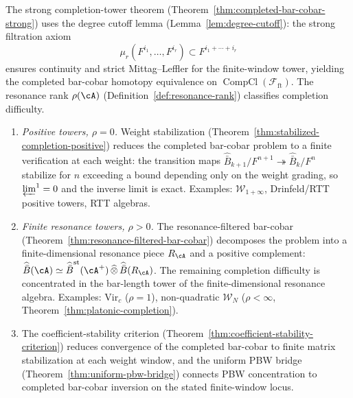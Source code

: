 \begin{construction}
\label{constr:completion-mc4}
The strong completion-tower theorem
(Theorem~\ref{thm:completed-bar-cobar-strong}) uses the degree cutoff
lemma
(Lemma~\ref{lem:degree-cutoff}): the strong filtration axiom
\[
\mu_r(F^{i_1}, \ldots, F^{i_r})
\subset F^{i_1 + \cdots + i_r}
\]
ensures continuity and strict Mittag--Leffler for the finite-window
tower, yielding the completed bar-cobar homotopy equivalence on
$\operatorname{CompCl}(\mathcal{F}_{\mathrm{ft}})$. The
resonance rank $\rho(\cA)$
(Definition~\ref{def:resonance-rank}) classifies completion
difficulty.
\begin{enumerate}[label=\textup{(\roman*)}]
\item \emph{Positive towers, $\rho = 0$.}
 Weight stabilization
 (Theorem~\ref{thm:stabilized-completion-positive})
 reduces the completed bar-cobar problem to a finite
 verification at each weight: the transition maps
 $\widehat{\bar B}_{k+1}/F^{n+1}
 \twoheadrightarrow
 \widehat{\bar B}_k/F^n$
 stabilize for $n$ exceeding a bound depending only on
 the weight grading, so
 $\varprojlim^1 = 0$ and the inverse limit is exact.
 Examples: $\mathcal{W}_{1+\infty}$, Drinfeld/RTT positive
 towers, RTT algebras.
\item \emph{Finite resonance towers, $\rho > 0$.}
 The resonance-filtered bar-cobar
 (Theorem~\ref{thm:resonance-filtered-bar-cobar})
 decomposes the problem into a finite-dimensional
 resonance piece $R_\cA$ and a positive complement:
 $\widehat{\bar B}(\cA)
 \simeq
 \widehat{\bar B}^{\mathrm{st}}(\cA^+)
 \,\widehat{\otimes}\,
 \widehat{\bar B}(R_\cA)$.
 The remaining completion difficulty is concentrated in the
 bar-length tower of the finite-dimensional resonance algebra.
 Examples: $\mathrm{Vir}_c$ ($\rho = 1$),
 non-quadratic $\mathcal{W}_N$ ($\rho < \infty$,
 Theorem~\ref{thm:platonic-completion}).
\item The coefficient-stability criterion
 (Theorem~\ref{thm:coefficient-stability-criterion})
 reduces convergence of the completed bar-cobar to
 finite matrix stabilization at each weight window,
 and the uniform PBW bridge
 (Theorem~\ref{thm:uniform-pbw-bridge}) connects PBW concentration
 to completed bar-cobar inversion on the stated finite-window locus.
\end{enumerate}
\end{construction}

